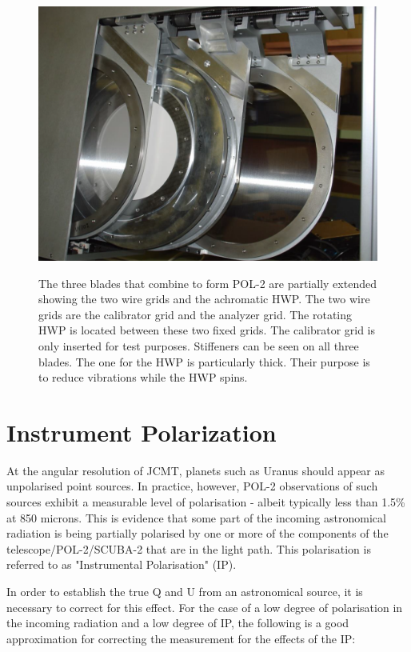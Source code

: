 \begin{figure}[t!]
\begin{center}
\includegraphics[width=0.7\linewidth]{pol2-three-components.png}
\label{fig:pol2components}
\caption [POL-2 components]{
  \small The three blades that combine to form POL-2 are partially
  extended showing the two wire grids and the achromatic HWP.
  The two wire grids are the calibrator grid and the analyzer grid.
  The rotating HWP is located between these two fixed grids.
  The calibrator grid is only inserted for test purposes.
  Stiffeners can be seen on all three blades. The one for the HWP
  is particularly thick. Their purpose is to reduce vibrations while
  the HWP spins.
}
\end{center}
\end{figure}




\section{Instrument Polarization}

At the angular resolution of JCMT, planets such as Uranus should appear as unpolarised point sources.
In practice, however, POL-2 observations of such sources exhibit a measurable level of polarisation - albeit typically less
than 1.5\% at 850 microns. This is evidence that some part of the incoming astronomical radiation
is being partially polarised by one or more of the components of the telescope/POL-2/SCUBA-2
that are in the light path. This polarisation is referred to as "Instrumental Polarisation" (IP).

In order to establish the true Q and U from an astronomical source, it is necessary to correct
for this effect. For the case of a low degree of polarisation in the incoming radiation and a low
degree of IP, the following is a good approximation for correcting the measurement for the effects of the IP:

